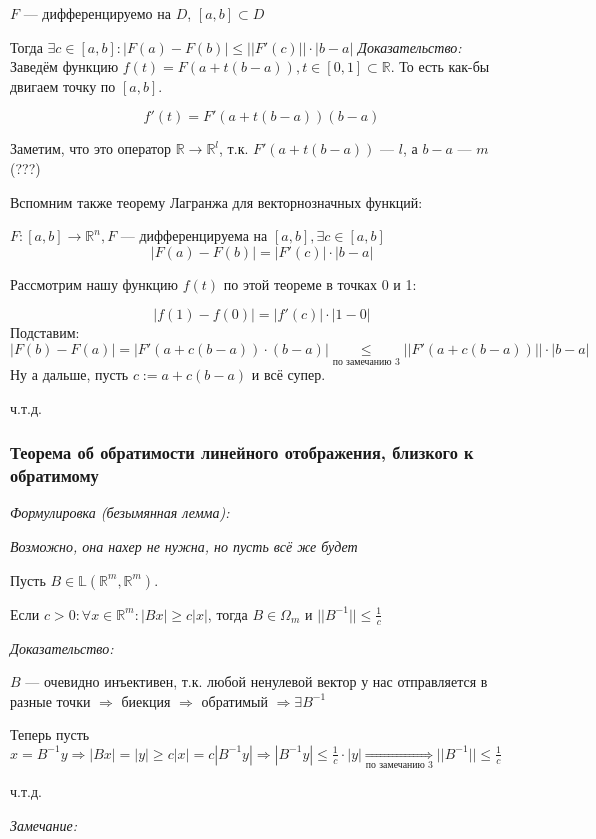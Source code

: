 \documentclass{article}
\begin{document}
$F$ --- дифференцируемо на $D$, $[a, b] \subset D$

Тогда $\exists c \in [a, b]: |F(a) - F(b)| \le ||F'(c)|| \cdot |b - a|$
\textit{Доказательство:}
Заведём функцию $f(t) = F(a + t(b - a)), t \in [0, 1] \subset \mathbb{R}$. То есть как-бы двигаем точку по $[a, b]$.

\[f'(t) = F'(a + t(b - a))(b - a)\]

Заметим, что это оператор $\mathbb{R} \rightarrow \mathbb{R}^l$, т.к. $F'(a + t(b - a))$ --- $l$, а $b - a$ --- $m$ (???)

Вспомним также теорему Лагранжа для векторнозначных функций:

$F: [a, b] \rightarrow \mathbb{R}^n, F$ --- дифференцируема на $[a, b], \exists c \in [a, b]$
\[|F(a) - F(b)| = |F'(c)| \cdot |b - a|\]

Рассмотрим нашу функцию $f(t)$ по этой теореме в точках 0 и 1:

\[|f(1) - f(0)| = |f'(c)| \cdot |1 - 0|\]
Подставим:
\[|F(b) - F(a)| = |F'(a + c(b - a))\cdot(b - a)| \underset{\text{по замечанию 3}}{\le} ||F'(a + c(b - a))|| \cdot |b - a|\]
Ну а дальше, пусть $c := a + c(b - a)$ и всё супер.

ч.т.д.



\subsubsection{Теорема об обратимости линейного отображения, близкого к обратимому}
\textit{Формулировка (безымянная лемма):}

\textit{Возможно, она нахер не нужна, но пусть всё же будет}

Пусть $B \in \mathbb{L}(\mathbb{R}^m, \mathbb{R}^m)$.

Если $c > 0: \forall x \in \mathbb{R}^m: |Bx| \ge c|x|$, тогда $B \in \Omega_m$ и $||B^{-1}|| \le \frac{1}{c}$

\textit{Доказательство:}

$B$ --- очевидно инъективен, т.к. любой ненулевой вектор у нас отправляется в разные точки $\Rightarrow$ биекция $\Rightarrow$ обратимый $\Rightarrow \exists B^{-1}$

Теперь пусть $x = B^{-1}y \Rightarrow |Bx| = |y| \ge c|x| = c |B^{-1}y| \Rightarrow |B^{-1}y| \le \frac{1}{c} \cdot |y| \underset{\text{по замечанию 3}}{\Rightarrow} ||B^{-1}|| \le \frac{1}{c}$

ч.т.д.

\textit{Замечание:}
\end{document}
